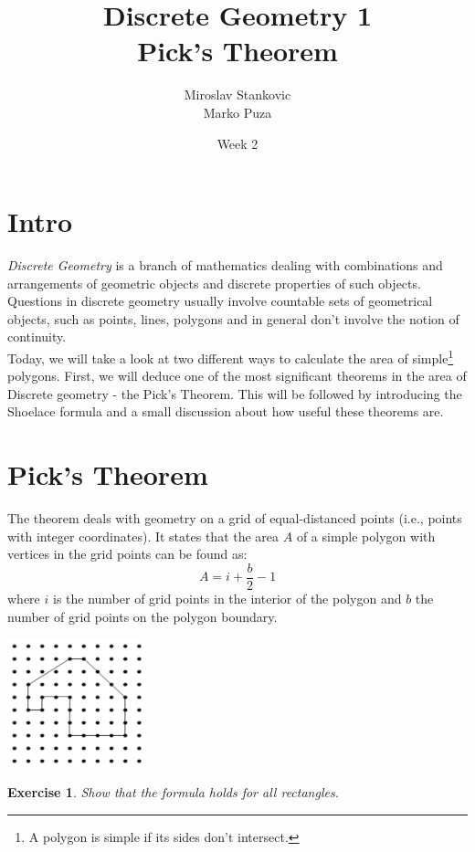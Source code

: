 \documentclass{article}
\title{\textbf{Discrete Geometry 1}\\Pick's Theorem}
\date{Week 2}
\author{Miroslav Stankovic\\ Marko Puza}
\newtheorem{exercise}{Exercise}
\begin{document}
\maketitle

\section*{Intro}

\emph{Discrete Geometry} is a branch of mathematics dealing with combinations and arrangements of geometric objects and discrete properties of such objects. Questions in discrete geometry usually involve countable sets of geometrical objects, such as points, lines, polygons and in general don't involve the notion of continuity. \\ Today, we will take a look at two different ways to calculate the area of simple\footnote{A polygon is simple if its sides don't intersect.} polygons. First, we will deduce one of the most significant theorems in the area of Discrete geometry - the Pick's Theorem. This will be followed by introducing the Shoelace formula and a small discussion about how useful these theorems are.


\section*{Pick's Theorem}

The theorem deals with geometry on a grid of equal-distanced points (i.e., points with integer coordinates). It states that the area $A$ of a simple polygon with vertices in the grid points can be found as:
 \[A = i + \frac{b}{2} - 1\] where $i$ is the number of grid points in the interior of the polygon and $b$ the number of grid points on the polygon boundary. \\

\begin{center}
\includegraphics[width=4cm]{pick}
\end{center}

\begin{exercise}
	Show that the formula holds for all rectangles.
\end{exercise}
\end{document}
